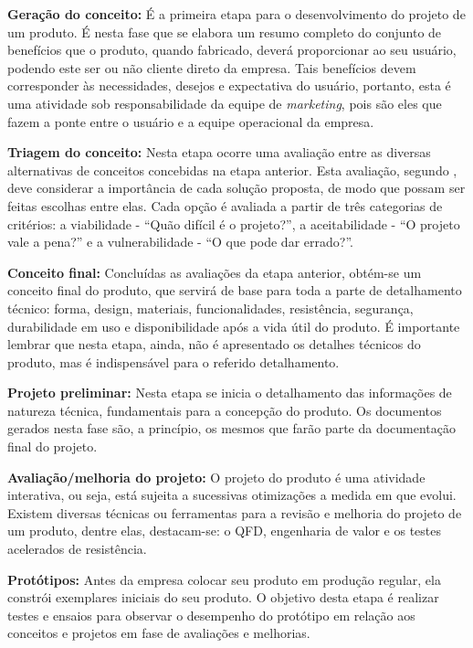\textbf{Geração do conceito:} É a primeira etapa para o desenvolvimento do projeto de um produto. É nesta fase que se elabora um resumo completo do conjunto de benefícios que o produto, quando fabricado, deverá proporcionar ao seu usuário, podendo este ser ou não cliente direto da empresa. Tais benefícios devem corresponder às necessidades, desejos e expectativa do usuário, portanto, esta é uma atividade sob responsabilidade da equipe de \textit{marketing}, pois são eles que fazem a ponte entre o usuário e a equipe operacional da empresa.

\textbf{Triagem do conceito:} Nesta etapa ocorre uma avaliação entre as diversas alternativas de conceitos concebidas na etapa anterior. Esta avaliação, segundo \cite{slack2006administracao}, deve considerar a importância de cada solução proposta, de modo que possam ser feitas escolhas entre elas. Cada opção é avaliada a partir de três categorias de critérios: a viabilidade - ``Quão difícil é o projeto?'', a aceitabilidade - ``O projeto vale a pena?'' e a vulnerabilidade - ``O que pode dar errado?''.

\textbf{Conceito final:} Concluídas as avaliações da etapa anterior, obtém-se um conceito final do produto, que servirá de base para toda a parte de detalhamento técnico: forma, design, materiais, funcionalidades, resistência, segurança, durabilidade em uso e disponibilidade após a vida útil do produto. É importante lembrar que nesta etapa, ainda, não é apresentado os detalhes técnicos do produto, mas é indispensável para o referido detalhamento.

\textbf{Projeto preliminar:} Nesta etapa se inicia o detalhamento das informações de natureza técnica, fundamentais para a concepção do produto. Os documentos gerados nesta fase são, a princípio, os mesmos que farão parte da documentação final do projeto.

\textbf{Avaliação/melhoria do projeto:} O projeto do produto é uma atividade interativa, ou seja, está sujeita a sucessivas otimizações a medida em que evolui. Existem diversas técnicas ou ferramentas para a revisão e melhoria do projeto de um produto, dentre elas, destacam-se: o \ac{QFD}, engenharia de valor e os testes acelerados de resistência.

\textbf{Protótipos:} Antes da empresa colocar seu produto em produção regular, ela constrói exemplares iniciais do seu produto. O objetivo desta etapa é realizar testes e ensaios para observar o desempenho do protótipo em relação aos conceitos e projetos em fase de avaliações e melhorias.

